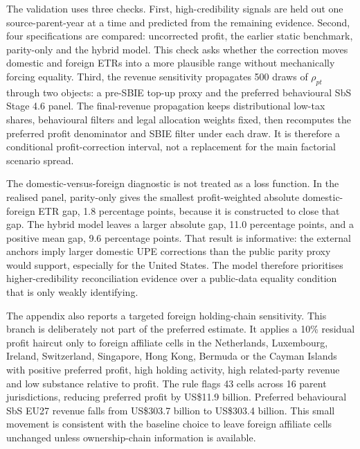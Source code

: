\documentclass[11pt,a4paper]{article}
\begin{document}


The validation uses three checks. First, high-credibility signals are held out one source-parent-year at a time and predicted from the remaining evidence. Second, four specifications are compared: uncorrected profit, the earlier static benchmark, parity-only and the hybrid model. This check asks whether the correction moves domestic and foreign ETRs into a more plausible range without mechanically forcing equality. Third, the revenue sensitivity propagates 500 draws of $\rho_{pt}$ through two objects: a pre-SBIE top-up proxy and the preferred behavioural SbS Stage 4.6 panel. The final-revenue propagation keeps distributional low-tax shares, behavioural filters and legal allocation weights fixed, then recomputes the preferred profit denominator and SBIE filter under each draw. It is therefore a conditional profit-correction interval, not a replacement for the main factorial scenario spread.

The domestic-versus-foreign diagnostic is not treated as a loss function. In the realised panel, parity-only gives the smallest profit-weighted absolute domestic-foreign ETR gap, 1.8 percentage points, because it is constructed to close that gap. The hybrid model leaves a larger absolute gap, 11.0 percentage points, and a positive mean gap, 9.6 percentage points. That result is informative: the external anchors imply larger domestic UPE corrections than the public parity proxy would support, especially for the United States. The model therefore prioritises higher-credibility reconciliation evidence over a public-data equality condition that is only weakly identifying.

The appendix also reports a targeted foreign holding-chain sensitivity. This branch is deliberately not part of the preferred estimate. It applies a 10\% residual profit haircut only to foreign affiliate cells in the Netherlands, Luxembourg, Ireland, Switzerland, Singapore, Hong Kong, Bermuda or the Cayman Islands with positive preferred profit, high holding activity, high related-party revenue and low substance relative to profit. The rule flags 43 cells across 16 parent jurisdictions, reducing preferred profit by US\$11.9 billion. Preferred behavioural SbS EU27 revenue falls from US\$303.7 billion to US\$303.4 billion. This small movement is consistent with the baseline choice to leave foreign affiliate cells unchanged unless ownership-chain information is available.


\end{document}
